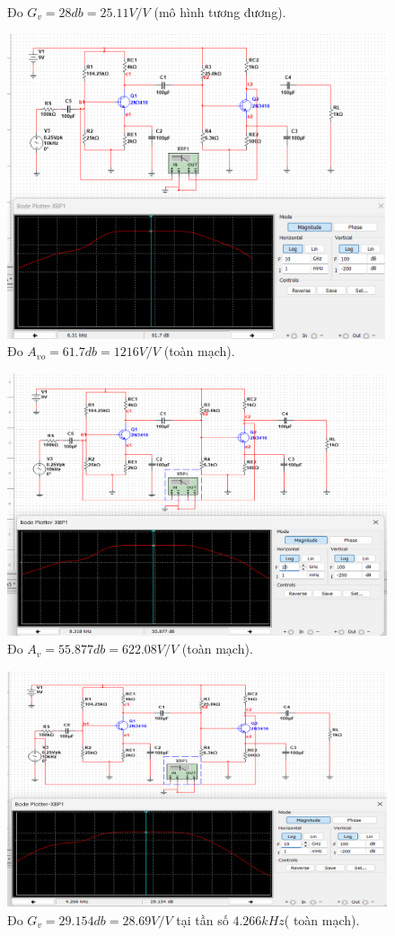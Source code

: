 \begin{itemize}[label=-]
\begin{figure}[H]
		\caption{Đo $G_{v} = 28 db =  25.11 V/V$ (mô hình tương đương).}
	\end{figure}
	\begin{figure}[H]
		\centering
		\includegraphics[width=.8\linewidth]{./my-chapters/my-images/Question10/b_ketqua_3.png}
		\caption{Đo $A_{vo} = 61.7db = 1216 V/V$ (toàn mạch).}
	\end{figure}
	\begin{figure}[H]
		\centering
		\includegraphics[width=.8\linewidth]{./my-chapters/my-images/Question10/b_ketqua_4.png}
		\caption{Đo $A_{v} = 55.877db = 622.08 V/V$ (toàn mạch).}
	\end{figure}
	\begin{figure}[H]
		\centering
		\includegraphics[width=.8\linewidth]{./my-chapters/my-images/Question10/b_ketqua_5.png}
		\caption{Đo $G_{v} = 29.154db = 28.69V/V$  tại tần số $4.266 kHz$( toàn mạch).}
	\end{figure}
\end{itemize}

